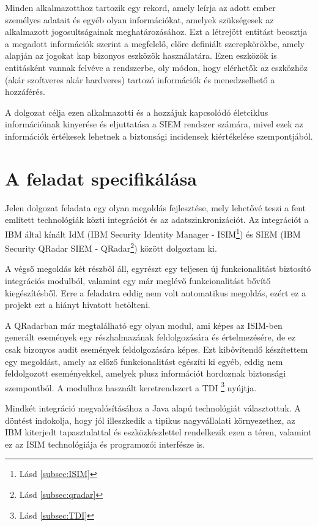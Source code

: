 Minden alkalmazotthoz tartozik egy rekord, amely leírja az adott ember személyes adatait és egyéb olyan információkat, amelyek szükségesek az alkalmazott jogosultságainak meghatározásához. Ezt a létrejött entitást beosztja a megadott információk szerint a megfelelő, előre definiált szerepkörökbe, amely alapján az jogokat kap bizonyos eszközök használatára. Ezen eszközök is entitásként vannak felvéve a rendszerbe, oly módon, hogy elérhetők az eszközhöz (akár szoftveres akár hardveres) tartozó információk és menedzselhető a hozzáférés.

A dolgozat célja ezen alkalmazotti és a hozzájuk kapcsolódó életciklus információinak kinyerése és eljuttatása a SIEM rendszer számára, mivel ezek az információk értékesek lehetnek a biztonsági incidensek kiértékelése szempontjából.

\section{A feladat specifikálása}

Jelen dolgozat feladata egy olyan megoldás fejlesztése, mely lehetővé teszi a fent említett technológiák közti integrációt és az adatszinkronizációt. Az integrációt a IBM által kínált IdM (IBM Security Identity Manager - ISIM\footnote{Lásd \ref{subsec:ISIM} }) és SIEM (IBM Security QRadar SIEM - QRadar\footnote{Lásd \ref{subsec:qradar} }) között dolgoztam ki.
 
A végső megoldás két részből áll, egyrészt egy teljesen új funkcionalitást biztosító integrációs modulból, valamint egy már meglévő funkcionalitást bővítő kiegészítésből. Erre a feladatra eddig nem volt automatikus megoldás, ezért ez a projekt ezt a hiányt hivatott betölteni.

A QRadarban már megtalálható egy olyan modul, ami képes az ISIM-ben generált események egy részhalmazának feldolgozására és értelmezésére, de ez csak bizonyos audit események feldolgozására képes. Ezt kibővítendő készítettem egy megoldást, amely az előző funkcionalitást egészíti ki egyéb, eddig nem feldolgozott eseményekkel, amelyek plusz információt hordoznak biztonsági szempontból. A modulhoz használt keretrendszert a TDI \footnote{\label{foot:TDI}Lásd \ref{subsec:TDI} } nyújtja.

Mindkét integráció megvalósításához a Java alapú technológiát választottuk. A döntést indokolja, hogy jól illeszkedik a tipikus nagyvállalati környezethez, az IBM kiterjedt tapasztalattal és eszközkészlettel rendelkezik ezen a téren, valamint ez az ISIM technológiája és programozói interfésze is.

